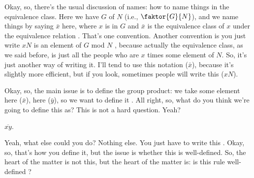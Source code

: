 \begin{proofWrapper}
\begin{speech}[00:57:35 - 00:58:41]
Okay, so, there's the usual discussion of names: how to name things in the equivalence class. Here we have $G$ of $N$ (i.e., $\faktor{G}{N}$), and we name things by saying $\bar{x}$ here, where $x$ is in $G$ and $\bar{x}$ is the equivalence class of $x$ under the equivalence relation . That's one convention. Another convention is you just write $x N$ is an element of $G$ mod $N$ , because actually the equivalence class, as we said before, is just all the people who are $x$ times some element of $N$. So, it's just another way of writing it. I'll tend to use this notation ($\bar{x}$), because it's slightly more efficient, but if you look, sometimes people will write this ($x N$).

Okay, so, the main issue is to define the group product: we take some element here ($\bar{x}$), here ($\bar{y}$), so we want to define it . All right, so, what do you think we're going to define this as? This is not a hard question. Yeah?
\end{speech}

\begin{student}
 $\overline{xy}$.
\end{student}

\begin{speech}[00:58:43 - 00:59:08]
Yeah, what else could you do? Nothing else. You just have to write this . Okay, so, that's how you define it, but the issue is whether this is well-defined. So, the heart of the matter is not this, but the heart of the matter is: is this rule well-defined ?
\end{speech}

\begin{content}


\end{content}
\end{proofWrapper}
